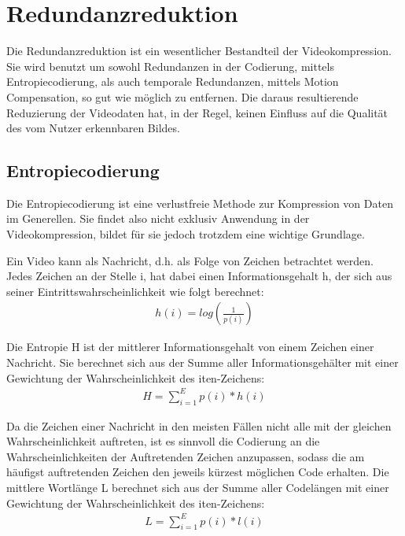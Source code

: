\chapter{Redundanzreduktion}
\label{kap:Redundanzreduktion}

Die Redundanzreduktion ist ein wesentlicher Bestandteil der Videokompression. Sie wird benutzt um sowohl Redundanzen in der Codierung, mittels Entropiecodierung, als auch temporale Redundanzen, mittels Motion Compensation, so gut wie möglich zu entfernen. Die daraus resultierende Reduzierung der Videodaten hat, in der Regel, keinen Einfluss auf die Qualität des vom Nutzer erkennbaren Bildes.

\section{Entropiecodierung}

Die Entropiecodierung ist eine verlustfreie Methode zur Kompression von Daten im Generellen. Sie findet also nicht exklusiv Anwendung in der Videokompression, bildet für sie jedoch trotzdem eine wichtige Grundlage.

Ein Video kann als Nachricht, d.h. als Folge von Zeichen betrachtet werden. Jedes Zeichen an der Stelle i, hat dabei einen Informationsgehalt h, der sich aus seiner Eintrittswahrscheinlichkeit wie folgt berechnet:
\begin{align*}
h(i) = log(\frac{1}{p(i)})
\end{align*}

Die Entropie H ist der mittlerer Informationsgehalt von einem Zeichen einer Nachricht.
Sie berechnet sich aus der Summe aller Informationsgehälter mit einer Gewichtung der Wahrscheinlichkeit des iten-Zeichens:
\begin{align*}
H = \sum_{i=1}^E p(i) * h(i)
\end{align*}

Da die Zeichen einer Nachricht in den meisten Fällen nicht alle mit der gleichen Wahrscheinlichkeit auftreten, ist es sinnvoll die Codierung an die Wahrscheinlichkeiten der Auftretenden Zeichen anzupassen, sodass die am häufigst auftretenden Zeichen den jeweils kürzest möglichen Code erhalten.\cite{symes_peter_digital_2004}
Die mittlere Wortlänge L berechnet sich aus der Summe aller Codelängen mit einer Gewichtung der Wahrscheinlichkeit des iten-Zeichens: 
\begin{align*}
L = \sum_{i=1}^E p(i) * l(i)
\end{align*}


